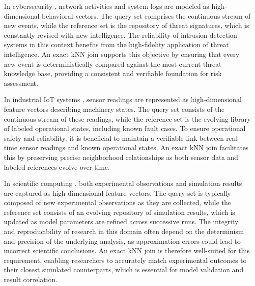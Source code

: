 In cybersecurity \cite{chen2017survey, singh2024network, qi2021detecting, xu2020combination}, network activities and system logs are modeled as high-dimensional behavioral vectors. The query set comprises the continuous stream of new events, while the reference set is the repository of threat signatures, which is constantly revised with new intelligence. The reliability of intrusion detection systems in this context benefits from the high-fidelity application of threat intelligence. An exact kNN join supports this objective by ensuring that every new event is deterministically compared against the most current threat knowledge base, providing a consistent and verifiable foundation for risk assessment.

In industrial IoT systems \cite{kumar2015hybrid, wei2016multisensor, wang2021weighted, yang2020secure,younes2021efficient}, sensor readings are represented as high-dimensional feature vectors describing machinery states. The query set consists of the continuous stream of these readings, while the reference set is the evolving library of labeled operational states, including known fault cases. To ensure operational safety and reliability, it is beneficial to maintain a verifiable link between real-time sensor readings and known operational states. An exact kNN join facilitates this by preserving precise neighborhood relationships as both sensor data and labeled references evolve over time.

In scientific computing \cite{giommi2023machine, kheddar2024image, shivahare2022survey}, both experimental observations and simulation results are captured as high-dimensional feature vectors. The query set is typically composed of new experimental observations as they are collected, while the reference set consists of an evolving repository of simulation results, which is updated as model parameters are refined across successive runs. The integrity and reproducibility of research in this domain often depend on the determinism and precision of the underlying analysis, as approximation errors could lead to incorrect scientific conclusions. An exact kNN join is therefore well-suited for this requirement, enabling researchers to accurately match experimental outcomes to their closest simulated counterparts, which is essential for model validation and result correlation.

